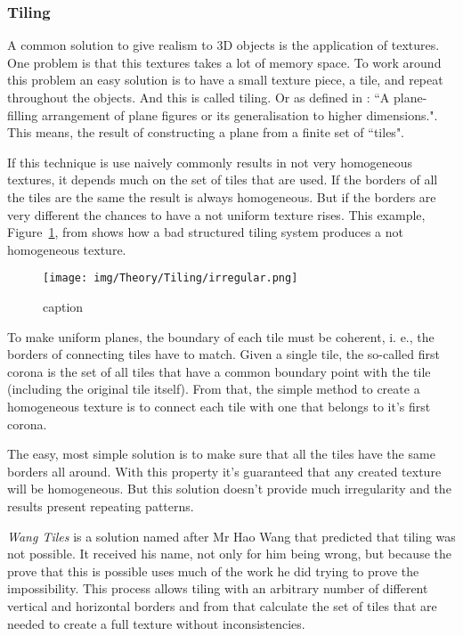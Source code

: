 
\subsubsection{Tiling} %
\label{ssub:tiling}

A common solution to give realism to 3D objects is the application of textures. One problem is that this textures takes a lot of memory space. To work around this problem an easy solution is to have a small texture piece, a tile, and repeat throughout the objects. And this is called tiling. Or as defined in \cite{TilingWOLFRAM}: ``A plane-filling arrangement of plane figures or its generalisation to higher dimensions.".  This means, the result of constructing a plane from a finite set of ``tiles". 

If this technique is use naively commonly results in not very homogeneous textures, it depends much on the set of tiles that are used. If the borders of all the tiles are the same the result is always homogeneous. But if the borders are very different the chances to have a not uniform texture rises. This example, Figure~\ref{fig:TIrregulartexture}, from \cite{ProcWorld} shows how a bad structured tiling system produces a not homogeneous texture.  


\begin{figure}[htbp]
	\centering
	\texttt{[image: img/Theory/Tiling/irregular.png]}
	\caption{caption}
	\label{fig:TIrregulartexture}
\end{figure}


To make uniform planes, the boundary of each tile must be coherent, i. e., the borders of connecting tiles have to match. Given a single tile, the so-called first corona is the set of all tiles that have a common boundary point with the tile (including the original tile itself). From that, the simple method to create a homogeneous texture is to connect each tile with one that belongs to it's first corona.

The easy, most simple solution is to make sure that all the tiles have the same borders all around. With this property it's guaranteed that any created texture will be homogeneous. But this solution doesn't provide much irregularity and the results present repeating patterns. 


\emph{Wang Tiles} is a solution named after Mr Hao Wang that predicted that tiling was not possible. It received his name, not only for him being wrong, but because the prove that this is possible uses much of the work he did trying to prove the impossibility. This process allows tiling with an arbitrary number of different vertical and horizontal borders and from that calculate the set of tiles that are needed to create a full texture without inconsistencies. 



